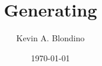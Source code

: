 \documentclass[12pt,a4paper]{article}
\author{Kevin A. Blondino}
\title{Generating}
\date{\today}
\begin{document}
\maketitle
\lipsum
\end{document}
